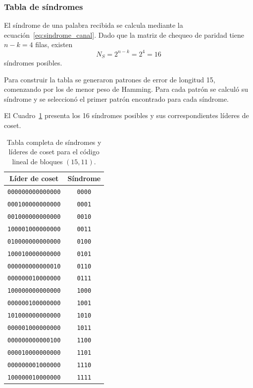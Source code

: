 \subsubsection{Tabla de síndromes}

El síndrome de una palabra recibida se calcula
mediante la ecuación~\ref{eq:sindrome_canal}.
Dado que la matriz de chequeo de paridad tiene
$n-k=4$ filas, existen
\begin{equation}
    N_S=2^{n-k}=2^4=16
\end{equation}
síndromes posibles.

Para construir la tabla se generaron patrones de error
de longitud 15, comenzando por los de menor peso
de Hamming.
Para cada patrón se calculó su síndrome y se seleccionó el primer patrón encontrado para
cada síndrome.

El Cuadro~\ref{tab:sindromes_canal} presenta los
16 síndromes posibles y sus correspondientes líderes
de coset.

\begin{table}[htbp]
    \centering
    \small
    \begin{tabular}{cc}
        \toprule
        Líder de coset & Síndrome \\
        \midrule
        \texttt{000000000000000} & \texttt{0000} \\
        \texttt{000100000000000} & \texttt{0001} \\
        \texttt{001000000000000} & \texttt{0010} \\
        \texttt{100001000000000} & \texttt{0011} \\
        \texttt{010000000000000} & \texttt{0100} \\
        \texttt{100010000000000} & \texttt{0101} \\
        \texttt{000000000000010} & \texttt{0110} \\
        \texttt{000000010000000} & \texttt{0111} \\
        \texttt{100000000000000} & \texttt{1000} \\
        \texttt{000000100000000} & \texttt{1001} \\
        \texttt{101000000000000} & \texttt{1010} \\
        \texttt{000001000000000} & \texttt{1011} \\
        \texttt{000000000000100} & \texttt{1100} \\
        \texttt{000010000000000} & \texttt{1101} \\
        \texttt{000000001000000} & \texttt{1110} \\
        \texttt{100000010000000} & \texttt{1111} \\
        \bottomrule
    \end{tabular}
    \caption{Tabla completa de síndromes y líderes de coset
    para el código lineal de bloques $(15,11)$.}
    \label{tab:sindromes_canal}
\end{table}

